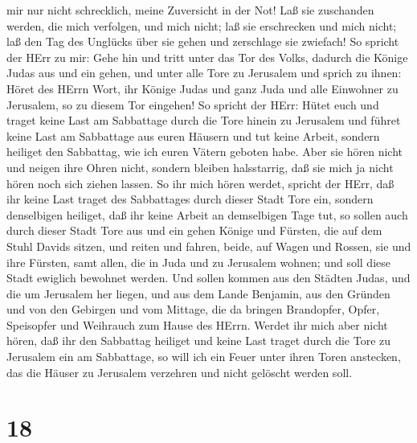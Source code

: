 mir nur nicht schrecklich, meine Zuversicht in der Not! 
Laß sie zuschanden werden, die mich verfolgen, und mich nicht; laß sie
erschrecken und mich nicht; laß den Tag des Unglücks über sie gehen und
zerschlage sie zwiefach!  So spricht der HErr zu mir: Gehe
hin und tritt unter das Tor des Volks, dadurch die Könige Judas aus und
ein gehen, und unter alle Tore zu Jerusalem  und sprich zu
ihnen: Höret des HErrn Wort, ihr Könige Judas und ganz Juda und alle
Einwohner zu Jerusalem, so zu diesem Tor eingehen!  So
spricht der HErr: Hütet euch und traget keine Last am Sabbattage durch
die Tore hinein zu Jerusalem  und führet keine Last am
Sabbattage aus euren Häusern und tut keine Arbeit, sondern heiliget den
Sabbattag, wie ich euren Vätern geboten habe.  Aber sie
hören nicht und neigen ihre Ohren nicht, sondern bleiben halsstarrig,
daß sie mich ja nicht hören noch sich ziehen lassen.  So
ihr mich hören werdet, spricht der HErr, daß ihr keine Last traget des
Sabbattages durch dieser Stadt Tore ein, sondern denselbigen heiliget,
daß ihr keine Arbeit an demselbigen Tage tut,  so sollen
auch durch dieser Stadt Tore aus und ein gehen Könige und Fürsten, die
auf dem Stuhl Davids sitzen, und reiten und fahren, beide, auf Wagen und
Rossen, sie und ihre Fürsten, samt allen, die in Juda und zu Jerusalem
wohnen; und soll diese Stadt ewiglich bewohnet werden.  Und
sollen kommen aus den Städten Judas, und die um Jerusalem her liegen,
und aus dem Lande Benjamin, aus den Gründen und von den Gebirgen und vom
Mittage, die da bringen Brandopfer, Opfer, Speisopfer und Weihrauch zum
Hause des HErrn.  Werdet ihr mich aber nicht hören, daß ihr
den Sabbattag heiliget und keine Last traget durch die Tore zu Jerusalem
ein am Sabbattage, so will ich ein Feuer unter ihren Toren anstecken,
das die Häuser zu Jerusalem verzehren und nicht gelöscht werden soll.

\hypertarget{section-17}{%
\section{18}\label{section-17}}

